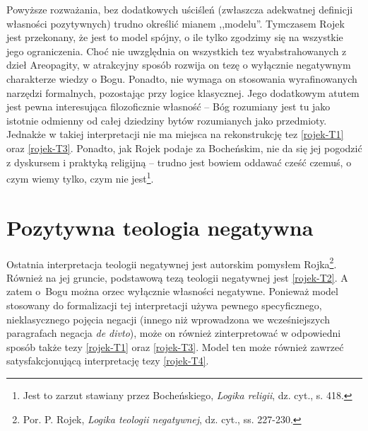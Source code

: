 Powyższe rozważania, bez dodatkowych uściśleń (zwłaszcza adekwatnej definicji własności pozytywnych)
trudno określić mianem ,,modelu''. Tymczasem Rojek jest przekonany, że jest to model spójny, o ile tylko zgodzimy się na
wszystkie jego ograniczenia. Choć nie
uwzględnia on wszystkich tez wyabstrahowanych z dzieł Areopagity, w
atrakcyjny sposób rozwija on tezę o wyłącznie negatywnym charakterze
wiedzy o Bogu. Ponadto, nie wymaga on stosowania wyrafinowanych
narzędzi formalnych, pozostając przy logice klasycznej. Jego dodatkowym
atutem jest pewna interesująca filozoficznie własność -- Bóg rozumiany
jest tu jako istotnie odmienny od całej dziedziny bytów rozumianych
jako przedmioty. Jednakże w takiej interpretacji nie ma miejsca na
rekonstrukcję tez \eqref{rojek-T1} oraz \eqref{rojek-T3}. Ponadto, jak Rojek podaje za Bocheńskim, nie da się jej pogodzić z
dyskursem i praktyką religijną -- trudno jest bowiem oddawać cześć
czemuś, o czym wiemy tylko, czym nie jest\footnote{Jest to zarzut
stawiany przez Bocheńskiego, \textit{Logika religii}, dz. cyt., s. 418.}.



\section{Pozytywna teologia negatywna}\label{roj-pozytywna}

Ostatnia interpretacja teologii negatywnej jest autorskim pomysłem
Rojka\footnote{Por. P. Rojek, \textit{Logika teologii negatywnej}, dz. cyt., ss. 227-230. }. Również na
jej gruncie, podstawową tezą teologii negatywnej jest \eqref{rojek-T2}. A zatem
o~Bogu można orzec wyłącznie własności negatywne. Ponieważ model
stosowany do formalizacji tej interpretacji używa pewnego
specyficznego, nieklasycznego pojęcia negacji (innego niż wprowadzona
we wcześniejszych paragrafach negacja \textit{de divto}), może on
również zinterpretować w odpowiedni sposób także tezy \eqref{rojek-T1} oraz \eqref{rojek-T3}.
Model ten może również zawrzeć satysfakcjonującą interpretację tezy
\eqref{rojek-T4}.

